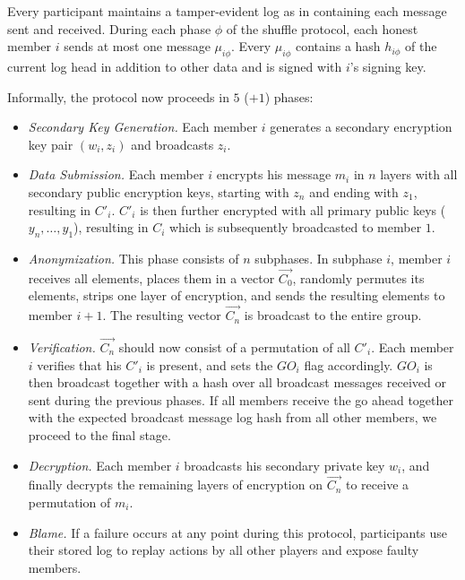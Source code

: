 Every participant maintains a tamper-evident log as in \cite{haeberlen2007peerreview}
containing each message sent and received. During each phase $\phi$ of the shuffle protocol,
each honest member $i$ sends at most one message $\mu_{i\phi}$.
Every $\mu_{i\phi}$ contains a hash $h_{i\phi}$ of the current log head in addition to other data
and is signed with $i$'s signing key.

Informally, the protocol now proceeds in $5$ ($ + 1$) phases:

\begin{itemize}
\item \emph{Secondary Key Generation.}
      Each member $i$ generates a secondary encryption key pair $(w_i, z_i)$ and broadcasts $z_i$.
\item \emph{Data Submission.}
      Each member $i$ encrypts his message $m_i$ in $n$ layers with all secondary public encryption keys,
      starting with $z_n$ and ending with $z_1$, resulting in $C'_i$.  $C'_i$ is then further encrypted
      with all primary public keys ($y_n, \ldots, y_1$), resulting in $C_i$ which is subsequently
      broadcasted to member $1$. 
\item \emph{Anonymization.}
      This phase consists of $n$ subphases. In subphase $i$, member $i$ receives all elements,
      places them in a vector $\vec{C_0}$, randomly permutes its elements, strips one layer of
      encryption, and sends the resulting elements to member $i + 1$. The resulting vector $\vec{C_n}$
      is broadcast to the entire group.
\item \emph{Verification.}
      $\vec{C_n}$ should now consist of a permutation of all $C'_i$. Each member $i$ verifies that
      his $C'_i$ is present, and sets the $GO_i$ flag accordingly. $GO_i$ is then broadcast
      together with a hash over all broadcast messages received or sent during the previous phases.
      If all members receive the go ahead together with the expected broadcast message log hash
      from all other members, we proceed to the final stage.
\item \emph{Decryption.}
      Each member $i$ broadcasts his secondary private key $w_i$, and finally decrypts the remaining
      layers of encryption on $\vec{C_n}$ to receive a permutation of $m_i$.
\item \emph{Blame.}
      If a failure occurs at any point during this protocol, participants use their stored
      log to replay actions by all other players and expose faulty members.
\end{itemize}

